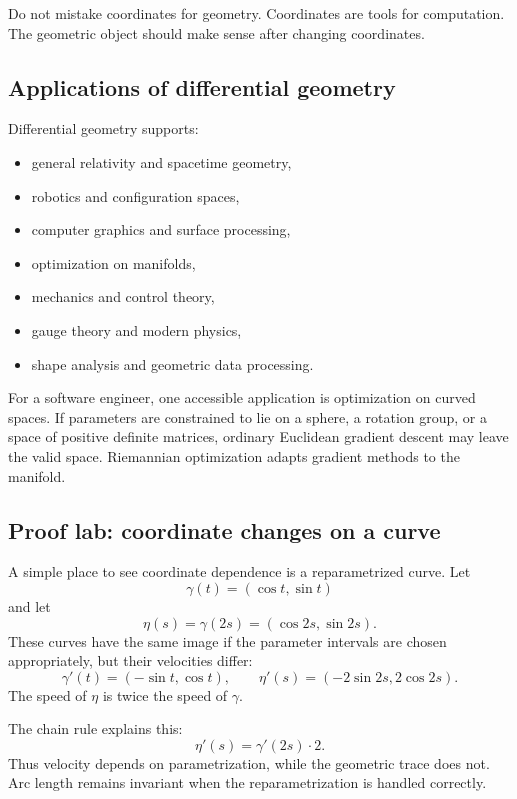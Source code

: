 \begin{trapbox}
Do not mistake coordinates for geometry. Coordinates are tools for computation.
The geometric object should make sense after changing coordinates.
\end{trapbox}

\subsection{Applications of differential geometry}

Differential geometry supports:

\begin{itemize}
\item general relativity and spacetime geometry,
\item robotics and configuration spaces,
\item computer graphics and surface processing,
\item optimization on manifolds,
\item mechanics and control theory,
\item gauge theory and modern physics,
\item shape analysis and geometric data processing.
\end{itemize}

For a software engineer, one accessible application is optimization on curved
spaces. If parameters are constrained to lie on a sphere, a rotation group, or a
space of positive definite matrices, ordinary Euclidean gradient descent may
leave the valid space. Riemannian optimization adapts gradient methods to the
manifold.

\subsection{Proof lab: coordinate changes on a curve}

A simple place to see coordinate dependence is a reparametrized curve. Let
\[
\gamma(t)=(\cos t,\sin t)
\]
and let
\[
\eta(s)=\gamma(2s)=(\cos 2s,\sin 2s).
\]
These curves have the same image if the parameter intervals are chosen
appropriately, but their velocities differ:
\[
\gamma'(t)=(-\sin t,\cos t),
\qquad
\eta'(s)=(-2\sin 2s,2\cos 2s).
\]
The speed of $\eta$ is twice the speed of $\gamma$.

The chain rule explains this:
\[
\eta'(s)=\gamma'(2s)\cdot 2.
\]
Thus velocity depends on parametrization, while the geometric trace does not.
Arc length remains invariant when the reparametrization is handled correctly.

